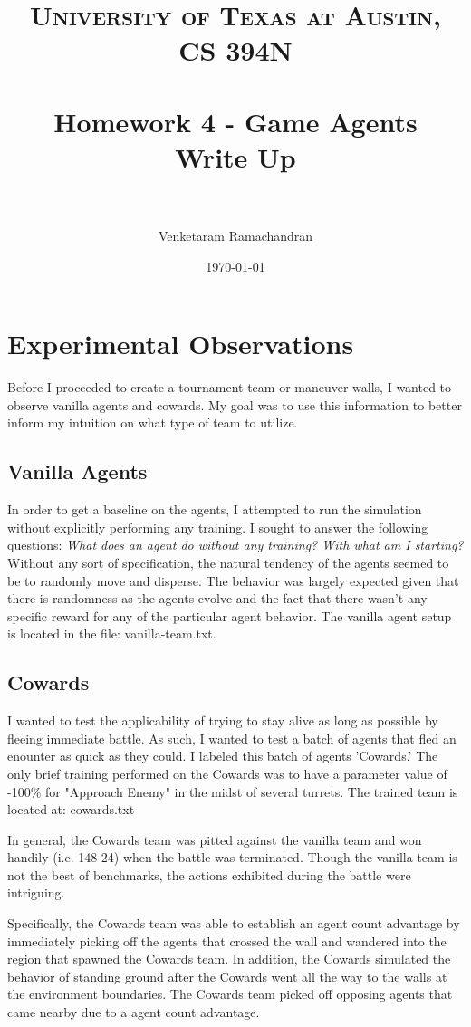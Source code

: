 \documentclass{article} %
\title{	
\normalfont \normalsize 
\textsc{University of Texas at Austin, CS 394N} \\
\horrule{0.6pt} \\[0.4cm] %
\huge Homework 4 - Game Agents \\[0.4cm]
\large Write Up  \\
\horrule{2pt} \\[0.5cm] %
}
\author{Venketaram Ramachandran} %
\date{\normalsize\today} %
\begin{document}
\maketitle %

\section{Experimental Observations}
Before I proceeded to create a tournament team or maneuver walls, I wanted to observe vanilla agents and cowards. My goal was to use this information to better inform my intuition on what type of team to utilize.

\subsection{Vanilla Agents}
In order to get a baseline on the agents, I attempted to run the simulation without explicitly performing any training. I sought to answer the following questions: \textit{What does an agent do without any training? With what am I starting?} 
\\[1\baselineskip]
Without any sort of specification, the natural tendency of the agents seemed to be to randomly move and disperse. The behavior was largely expected given that there is randomness as the agents evolve and the fact that there wasn't any specific reward for any of the particular agent behavior. The vanilla agent setup is located in the file: vanilla-team.txt.

\subsection{Cowards}
I wanted to test the applicability of trying to stay alive as long as possible by fleeing immediate battle. As such, I wanted to test a batch of agents that fled an enounter as quick as they could. I labeled this batch of agents 'Cowards.' The only brief training performed on the Cowards was to have a parameter value of -100\% for "Approach Enemy" in the midst of several turrets. The trained team is located at: cowards.txt

In general, the Cowards team was pitted against the vanilla team and won handily (i.e. 148-24) when the battle was terminated. Though the vanilla team is not the best of benchmarks, the actions exhibited during the battle were intriguing. 

Specifically, the Cowards team was able to establish an agent count advantage by immediately picking off the agents that crossed the wall and wandered into the region that spawned the Cowards team. In addition, the Cowards simulated the behavior of standing ground after the Cowards went all the way to the walls at the environment boundaries. The Cowards team picked off opposing agents that came nearby due to a agent count advantage.
\end{document}
